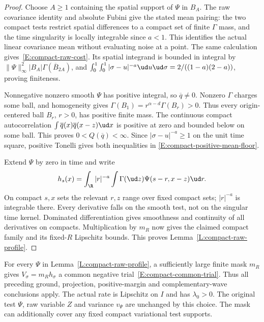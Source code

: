 \begin{proof}
  Choose $A\ge1$ containing the spatial support of $\Psi$ in $B_A$.
  The raw covariance identity and absolute Fubini give the stated
  mean pairing: the two compact tests restrict spatial differences
  to a compact set of finite $\Gamma$ mass, and the time singularity
  is locally integrable since $a<1$. This identifies the actual
  linear covariance mean without evaluating noise at a point.
  The same calculation gives~\eqref{E:compact-raw-cost}.
  Its spatial integrand is bounded in integral by
  $\|\Psi\|_\infty^2|B_A|\Gamma(\overline B_{2A})$,
  and $\int_0^1\int_0^1|\sigma-u|^{-a}\ud u\ud\sigma
  =2/((1-a)(2-a))$, proving finiteness.

  Nonnegative nonzero smooth $\Psi$ has positive integral, so
  $\overline q\ne0$. Nonzero $\Gamma$ charges some ball, and
  homogeneity gives
  $\Gamma(B_1)=r^{\alpha-d}\Gamma(B_r)>0$.
  Thus every origin-centered ball $B_r$, $r>0$, has positive finite mass.
  The continuous compact autocorrelation
  $\int\overline q(x)\overline q(x-z)\ud x$
  is positive at zero and bounded below on some ball.
  This proves $0<Q(\overline q)<\infty$.
  Since $|\sigma-u|^{-a}\ge1$ on the unit time square,
  positive Tonelli gives both inequalities in
  \eqref{E:compact-positive-mean-floor}.

  Extend $\Psi$ by zero in time and write
  \[
    h_s(x)=\int_\R |r|^{-a}
    \int\Gamma(\ud z)\Psi(s-r,x-z)\ud r.
  \]
  On compact $s,x$ sets the relevant $r,z$ range over fixed
  compact sets; $|r|^{-a}$ is integrable there. Every derivative
  falls on the smooth test, not on the singular time kernel.
  Dominated differentiation gives smoothness and continuity of all
  derivatives on compacts. Multiplication by $m_R$ now gives the
  claimed compact family and its fixed-$R$ Lipschitz bounds.
  This proves Lemma~\ref{L:compact-raw-profile}.
\end{proof}

\begin{proposition}
  \label{P:compact-original-common-trial}
  For every $\Psi$ in Lemma~\ref{L:compact-raw-profile}, a sufficiently
  large finite mask $m_R$ gives $V_\sigma=m_Rh_\sigma$ a common
  negative trial~\eqref{E:compact-common-trial}.
  Thus all preceding ground, projection, positive-margin and
  complementary-wave conclusions apply. The actual rate is
  Lipschitz on $I$ and has $\lambda_0>0$.
  The original test $\Psi$, raw variable $Z$ and variance $v_\Psi$
  are unchanged by this choice. The mask can additionally cover any
  fixed compact variational test supports.
\end{proposition}

